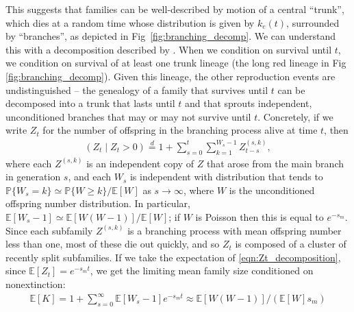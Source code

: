 \documentclass{article}
\newcommand{\linelabel}[1]{}
\newcommand{\citet}[1]{\cite{#1}}
\renewcommand{\P}{\mathbb{P}}
\newcommand{\E}{\mathbb{E}}
\newcommand{\deq}{\stackrel{\scriptscriptstyle{d}}{=}}
\begin{document}
This suggests that families can be well-described by motion of a central ``trunk'',
which dies at a random time whose distribution is given by $k_e(t)$,
surrounded by ``branches'',
as depicted in Fig~\ref{fig:branching_decomp}.
We can understand this with a decomposition described by \citet{geiger1999elementary}.
When we condition on survival until $t$, we condition on survival of at least one trunk lineage
(the long red lineage in Fig \ref{fig:branching_decomp}).
Given this lineage, the other reproduction events are undistinguished --
the genealogy of a family that survives until $t$
can be decomposed into a trunk that lasts until $t$
and that sprouts independent, unconditioned branches that may or may not survive until $t$.
Concretely, if we write $Z_t$ for the number of offspring in the branching process alive at time $t$,
then
\begin{align} \label{eqn:Zt_decomposition}
  \left( Z_t \; \vert \; Z_t>0 \right) \deq 1 + \sum_{s=0}^t \sum_{k=1}^{W_s-1} Z^{(s,k)}_{t-s},
\end{align}
where each $Z^{(s,k)}$ is an independent copy of $Z$ 
that arose from the main branch in generation $s$,
and each $W_s$ is independent with distribution 
that tends to $\P\{W_s=k\} \simeq \P\{W\ge k\}/\E[W]$ as $s \to \infty$,
where $W$ is the unconditioned offspring number distribution.  \linelabel{ll:branching_process_fix}
In particular, $\E[W_s-1] \simeq \E[W(W-1)]/\E[W]$;
if $W$ is Poisson then this is equal to $e^{-s_m}$.
Since each subfamily $Z^{(s,k)}$ is a branching process with mean offspring number less than one,
most of these die out quickly,
and so $Z_t$ is composed of a cluster of recently split subfamilies.
If we take the expectation of \eqref{eqn:Zt_decomposition},
since $\E[Z_t] = e^{-s_m t}$,
we get the limiting mean family size conditioned on nonextinction:
\begin{align} \label{eqn:mean_K}
    \E[K] 
    = 1 + \sum_{s=0}^\infty \E[W_s-1] e^{-s_m t}
    \approx \E[W(W-1)] / ( \E[W] s_m  )
\end{align}
\end{document}
